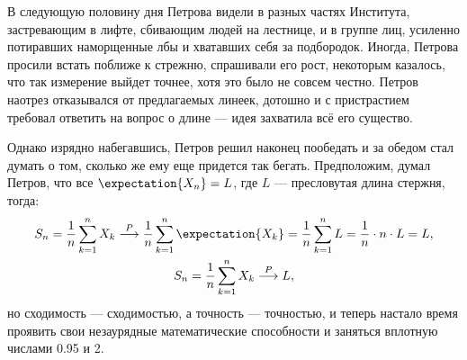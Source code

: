 \documentclass[a4paper,12pt]{article}
\begin{document}
    В следующую половину дня Петрова видели в разных частях Института, застревающим в лифте, сбивающим людей на лестнице, и в группе лиц, усиленно потиравших наморщенные лбы
    и хватавших себя за подбородок. Иногда, Петрова просили встать поближе к стрежню, спрашивали его рост, некоторым казалось, что так измерение выйдет точнее, хотя это было
    не совсем честно. Петров наотрез отказывался от предлагаемых линеек, дотошно и с пристрастием требовал ответить на вопрос о длине --- идея захватила всё его существо.

    Однако изрядно набегавшись, Петров решил наконец пообедать и за обедом стал думать о том, сколько же ему еще придется так бегать. Предположим, думал Петров, что все $\expectation{X_n} = L$, где $L$ --- пресловутая длина стержня, тогда:
    \begin{gather}
        S_n = \frac{1}{n} \sum_{k=1}^n X_k \stackrel{P}{\longrightarrow} \frac{1}{n} \sum_{k=1}^n \expectation{X_k} = \frac{1}{n} \sum_{k=1}^n L = \frac{1}{n} \cdot n \cdot L = L , \\
        S_n = \frac{1}{n} \sum_{k=1}^n X_k \stackrel{P}{\longrightarrow} L ,
    \end{gather}
    но сходимость --- сходимостью, а точность --- точностью, и теперь настало время проявить свои незаурядные математические способности и заняться вплотную числами 0.95 и 2.
\end{document}
